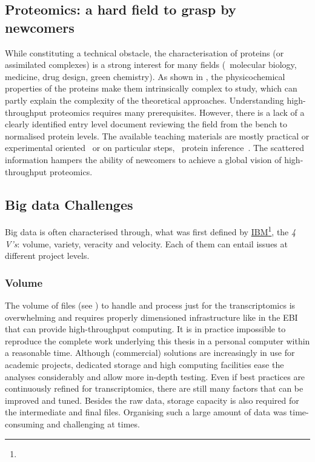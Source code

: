 \vspace{-3mm}
\subsection*{Proteomics: a hard field to grasp by newcomers}
\vspace{-6mm}
While constituting a technical obstacle,
the characterisation of proteins (or assimilated complexes)
is a strong interest for many fields
(\eg\ molecular biology, medicine, drug design, green chemistry).
As shown in ,
the physicochemical properties of the proteins make them
intrinsically complex to study,
which can partly explain the complexity of the theoretical approaches.
Understanding high-throughput proteomics requires many prerequisites.
However, there is a lack of a clearly identified entry level document
reviewing the field from the bench to normalised protein levels.
The available teaching materials are mostly
practical or experimental oriented~ or
on particular steps, \eg\ protein inference~.
The scattered information hampers the ability of newcomers
to achieve a global vision of high-throughput proteomics.\mybr\

\subsection*{Big data Challenges}
Big data is often characterised through, what was first defined by
\href{https://www.ibmbigdatahub.com/infographic/four-vs-big-data}{IBM}\footnote{%
},
the \emph{4 V's}: volume, variety, veracity and velocity.
Each of them can entail issues at different project levels.

\subsubsection*{Volume}
The volume of files (see )
to handle and process just for the transcriptomics
is overwhelming and requires properly dimensioned infrastructure
like in the \gls{EBI} that can provide high-throughput computing.
It is in practice impossible to reproduce the complete work underlying
this thesis in a personal computer within a reasonable time.
Although (commercial) solutions are increasingly in use for academic projects,
dedicated storage and high computing facilities ease the analyses considerably
and allow more in-depth testing.
Even if best practices are continuously refined for transcriptomics,
there are still many factors that can be improved and tuned.
Besides the raw data,
storage capacity is also required for the intermediate and final files.
Organising such a large amount of data was time-consuming and
challenging at times.\mybr\


